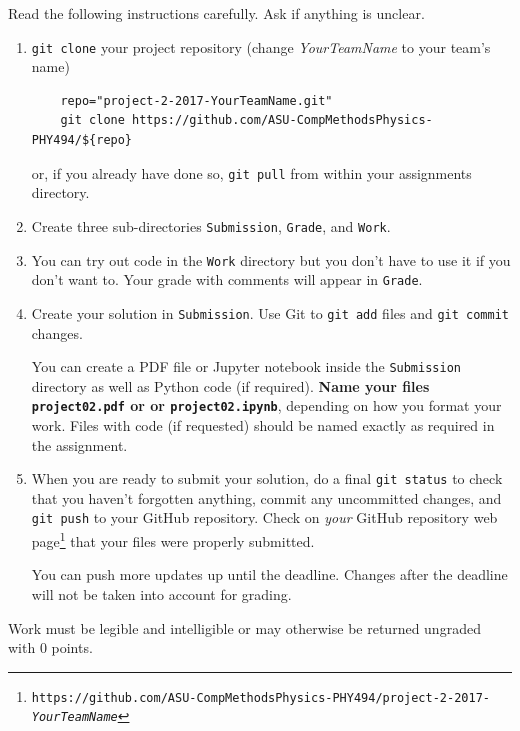 \documentclass[letterpaper]{scrartcl}
\newcommand{\anumber}{2}
\newcommand{\anum}{0\anumber}
\begin{document}
\noindent
Read the following instructions carefully. Ask if anything is unclear.
\begin{enumerate}
\item \texttt{git clone} your project repository (change
  \emph{YourTeamName} to your team's name)
  \begin{verbatim}
    repo="project-2-2017-YourTeamName.git" 
    git clone https://github.com/ASU-CompMethodsPhysics-PHY494/${repo}
  \end{verbatim}
  or, if you already have done so, \texttt{git pull} from
  within your assignments directory.
\item  Create three sub-directories \texttt{Submission},
  \texttt{Grade}, and
  \texttt{Work}.
\item You can try out code in the \texttt{Work}
  directory but you don't have to use it if you don't want to. Your
  grade with comments will appear in
  \texttt{Grade}.
\item Create your solution in
  \texttt{Submission}. Use Git to \texttt{git
    add} files and \texttt{git commit} changes.

  You can create a PDF file or Jupyter notebook inside the
  \texttt{Submission} directory as well as Python
  code (if required). \textbf{Name your files \texttt{project\anum.pdf} or
    or \texttt{project\anum.ipynb}}, depending on how
  you format your work. Files with code (if requested) should be named
  exactly as required in the assignment.
\item When you are ready to submit your solution, do a final
  \texttt{git status} to check that you haven't forgotten anything,
  commit any uncommitted changes, and \texttt{git push} to your GitHub
  repository. Check on \emph{your} GitHub repository web
  page\footnote{\texttt{https://github.com/ASU-CompMethodsPhysics-PHY494/project-2-2017-\emph{YourTeamName}}}
  that your files were properly submitted.

  You can push more updates up until the deadline. Changes after the
  deadline will not be taken into account for grading.
\end{enumerate}
Work must be legible and intelligible or may otherwise be
returned ungraded with 0 points.
\end{document}
